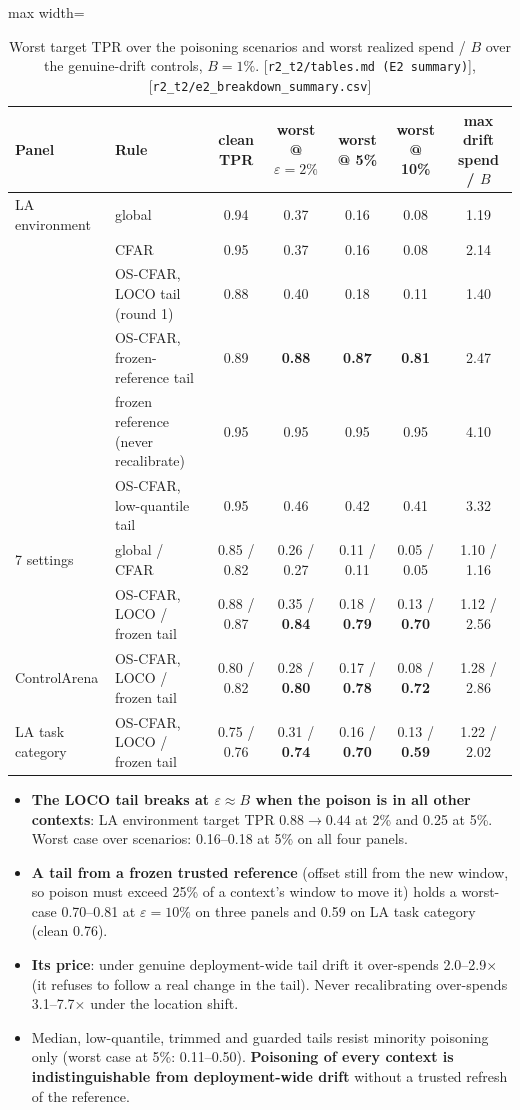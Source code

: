 \documentclass[11pt]{article}
\newcommand{\src}[1]{{\footnotesize\textcolor{ink2}{[\nolinkurl{#1}]}}}
\begin{document}
\begin{table}[!htb]\centering\small
\begin{adjustbox}{max width=\linewidth}\begin{tabular}{@{}llccccc@{}}
\toprule
Panel & Rule & clean TPR & worst @ $\varepsilon=2\%$ & worst @ 5\% & worst @ 10\% & max drift spend / $B$\\
\midrule
LA environment & global & 0.94 & 0.37 & 0.16 & 0.08 & 1.19\\
& CFAR & 0.95 & 0.37 & 0.16 & 0.08 & 2.14\\
& OS-CFAR, LOCO tail (round 1) & 0.88 & 0.40 & 0.18 & 0.11 & 1.40\\
& OS-CFAR, frozen-reference tail & 0.89 & \textbf{0.88} & \textbf{0.87} & \textbf{0.81} & 2.47\\
& frozen reference (never recalibrate) & 0.95 & 0.95 & 0.95 & 0.95 & 4.10\\
& OS-CFAR, low-quantile tail & 0.95 & 0.46 & 0.42 & 0.41 & 3.32\\
7 settings & global / CFAR & 0.85 / 0.82 & 0.26 / 0.27 & 0.11 / 0.11 & 0.05 / 0.05 & 1.10 / 1.16\\
& OS-CFAR, LOCO / frozen tail & 0.88 / 0.87 & 0.35 / \textbf{0.84} & 0.18 / \textbf{0.79} & 0.13 / \textbf{0.70} & 1.12 / 2.56\\
ControlArena & OS-CFAR, LOCO / frozen tail & 0.80 / 0.82 & 0.28 / \textbf{0.80} & 0.17 / \textbf{0.78} & 0.08 / \textbf{0.72} & 1.28 / 2.86\\
LA task category & OS-CFAR, LOCO / frozen tail & 0.75 / 0.76 & 0.31 / \textbf{0.74} & 0.16 / \textbf{0.70} & 0.13 / \textbf{0.59} & 1.22 / 2.02\\
\bottomrule
\end{tabular}\end{adjustbox}
\caption{Worst target TPR over the poisoning scenarios and worst realized spend / $B$ over the genuine-drift controls, $B=1\%$. \src{r2_t2/tables.md (E2 summary)}, \src{r2_t2/e2_breakdown_summary.csv}}
\end{table}
\begin{itemize}
\item \textbf{The LOCO tail breaks at $\varepsilon\approx B$ when the poison is in all other contexts}: LA environment target TPR $0.88\to0.44$ at 2\% and 0.25 at 5\%. Worst case over scenarios: 0.16--0.18 at 5\% on all four panels.
\item \textbf{A tail from a frozen trusted reference} (offset still from the new window, so poison must exceed 25\% of a context's window to move it) holds a worst-case 0.70--0.81 at $\varepsilon=10\%$ on three panels and 0.59 on LA task category (clean 0.76).
\item \textbf{Its price}: under genuine deployment-wide tail drift it over-spends 2.0--2.9$\times$ (it refuses to follow a real change in the tail). Never recalibrating over-spends 3.1--7.7$\times$ under the location shift.
\item Median, low-quantile, trimmed and guarded tails resist minority poisoning only (worst case at 5\%: 0.11--0.50). \textbf{Poisoning of every context is indistinguishable from deployment-wide drift} without a trusted refresh of the reference.
\end{itemize}
\end{document}
